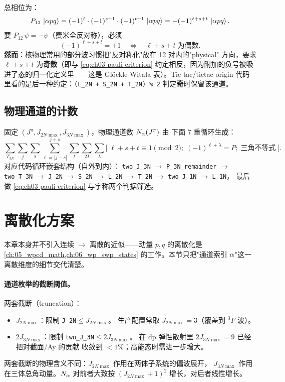 总相位为：
\begin{equation}
\label{eq:ch03-pauli-phase}
P_{12}\,\ket{\alpha p q}
= (-1)^\ell \cdot (-1)^{s+1} \cdot (-1)^{t+1}\,\ket{\alpha p q}
= -(-1)^{\ell + s + t}\,\ket{\alpha p q}.
\end{equation}
要 \(P_{12}\,\psi = -\psi\)（费米全反对称），必须
\begin{equation}
\label{eq:ch03-pauli-criterion}
(-1)^{\ell + s + t} = +1
\quad\Leftrightarrow\quad
\ell + s + t \;\text{为偶数}.
\end{equation}
\textbf{然而}：核物理常用的部分波习惯把"反对称化"放在 12 对内的"physical"
方向，要求 \(\ell + s + t\) 为\textbf{奇数}（即与 \cref{eq:ch03-pauli-criterion}
约定相反，因为附加的负号被吸进了态的归一化定义里——这是 Glöckle-Witała
表）。Tic-tac/tictac-origin 代码里看的是后一种约定：\verb|(L_2N + S_2N + T_2N) % 2|
判定\textbf{奇}时保留该通道。

\subsection{物理通道的计数}
\label{subsec:ch03-count-formula}

固定 \((J^\pi, J_{2N\max}, J_{3N\max})\)，物理通道数 \(N_\alpha(J^\pi)\) 由
下面 7 重循环生成：
\[
\sum_{T_{3N}} \sum_{j} \sum_{s} \sum_{\ell=|j-s|}^{j+s} \sum_{t}
\sum_{2I} \sum_{\lambda}
\Big[\;
\ell+s+t \equiv 1 \pmod 2;\;
(-1)^{\ell+\lambda} = P;\;
\text{三角不等式}
\;\Big].
\]
对应代码循环嵌套结构（自外到内）：
\verb|two_J_3N| \(\to\) \verb|P_3N_remainder| \(\to\) \verb|two_T_3N| \(\to\)
\verb|J_2N| \(\to\) \verb|S_2N| \(\to\) \verb|L_2N| \(\to\) \verb|T_2N| \(\to\)
\verb|two_J_1N| \(\to\) \verb|L_1N|，
最后做 \cref{eq:ch03-pauli-criterion} 与宇称两个判据筛选。

\section{离散化方案}
\label{sec:ch03-discretization}

本章本身并不引入连续 \(\to\) 离散的近似——动量 \(p, q\) 的离散化是
\cref{ch:05_wpcd_math,ch:06_wp_swp_states} 的工作。本节只把"通道索引
\(\alpha\)"这一离散维度的细节交代清楚。

\paragraph{通道枚举的截断阈值。}
两套截断（truncation）：
\begin{itemize}
  \item \(J_{2N\max}\)：限制 \verb|J_2N|\(\le J_{2N\max}\)。
        生产配置常取 \(J_{2N\max} = 3\)（覆盖到 \({}^3F\) 波）。
  \item \(2J_{3N\max}\)：限制 \verb|two_J_3N|\(\le 2J_{3N\max}\)。
        在 dp 弹性散射里 \(2J_{3N\max} = 9\) 已经把对截面/Ay 的贡献
        收敛到 \(<1\%\)；高能态时需进一步增大。
\end{itemize}
两套截断的物理含义不同：\(J_{2N\max}\) 作用在两体子系统的偏波展开，
\(J_{3N\max}\) 作用在三体总角动量。\(N_\alpha\) 对前者大致按
\((J_{2N\max}+1)^2\) 增长，对后者线性增长。


